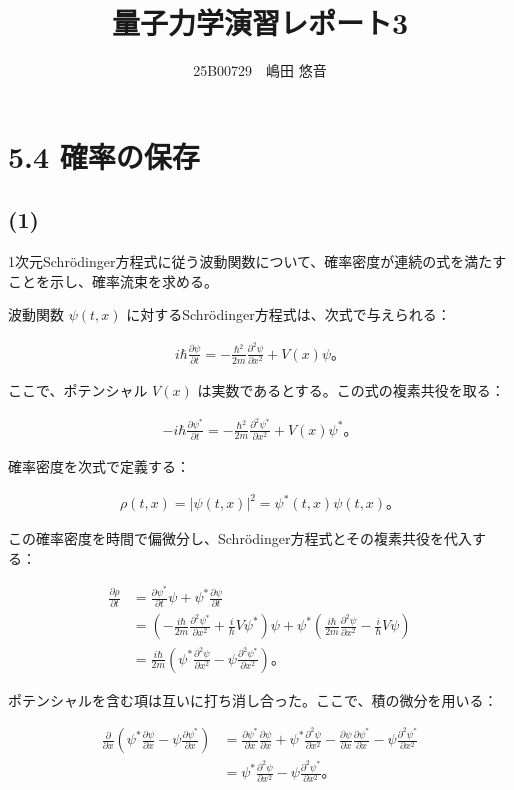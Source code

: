 \documentclass[platex,dvipdfmx,a4paper]{jsarticle}
\title{量子力学演習レポート3}
\author{25B00729　嶋田 悠音}
\newcommand{\hb}[2]{\frac{\partial #1}{\partial #2}}
\newcommand{\nhb}[3]{\frac{\partial^{#1} #2}{\partial #3^{#1}}}
\begin{document}
\maketitle
\section*{5.4 確率の保存}

\subsection*{(1)}

1次元Schrödinger方程式に従う波動関数について、確率密度が連続の式を満たすことを示し、確率流束を求める。

波動関数 $\psi(t,x)$ に対するSchrödinger方程式は、次式で与えられる：

\begin{align*}
  i\hbar\hb{\psi}{t}
  =-\frac{\hbar^2}{2m}\nhb{2}{\psi}{x}+V(x)\psi。
\end{align*}

ここで、ポテンシャル $V(x)$ は実数であるとする。この式の複素共役を取る：

\begin{align*}
  -i\hbar\hb{\psi^*}{t}
  =-\frac{\hbar^2}{2m}\nhb{2}{\psi^*}{x}+V(x)\psi^*。
\end{align*}

確率密度を次式で定義する：

\begin{align*}
  \rho(t,x)=|\psi(t,x)|^2=\psi^*(t,x)\psi(t,x)。
\end{align*}

この確率密度を時間で偏微分し、Schrödinger方程式とその複素共役を代入する：

\begin{align*}
  \hb{\rho}{t}
  &=\hb{\psi^*}{t}\psi+\psi^*\hb{\psi}{t} \\
  &=\left(
    -\frac{i\hbar}{2m}\nhb{2}{\psi^*}{x}
    +\frac{i}{\hbar}V\psi^*
  \right)\psi
  +\psi^*\left(
    \frac{i\hbar}{2m}\nhb{2}{\psi}{x}
    -\frac{i}{\hbar}V\psi
  \right) \\
  &=\frac{i\hbar}{2m}
  \left(
    \psi^*\nhb{2}{\psi}{x}
    -\psi\nhb{2}{\psi^*}{x}
  \right)。
\end{align*}

ポテンシャルを含む項は互いに打ち消し合った。ここで、積の微分を用いる：

\begin{align*}
  \hb{}{x}
  \left(
    \psi^*\hb{\psi}{x}
    -\psi\hb{\psi^*}{x}
  \right)
  &=\hb{\psi^*}{x}\hb{\psi}{x}
  +\psi^*\nhb{2}{\psi}{x}
  -\hb{\psi}{x}\hb{\psi^*}{x}
  -\psi\nhb{2}{\psi^*}{x} \\
  &=\psi^*\nhb{2}{\psi}{x}
  -\psi\nhb{2}{\psi^*}{x}。
\end{align*}
\end{document}
